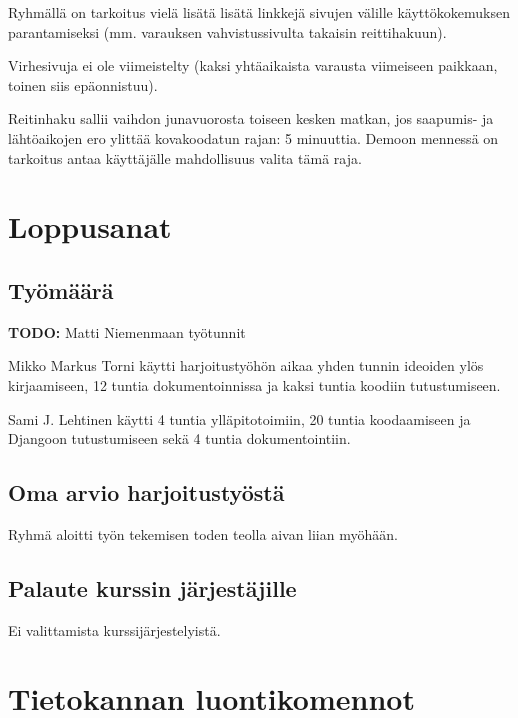 \documentclass[a4paper,twoside,titlepage,12pt]{article}
\begin{document}
Ryhmällä on tarkoitus vielä lisätä lisätä linkkejä sivujen välille
käyttökokemuksen parantamiseksi (mm. varauksen vahvistussivulta takaisin
reittihakuun).

Virhesivuja ei ole viimeistelty (kaksi yhtäaikaista varausta viimeiseen
paikkaan, toinen siis epäonnistuu).

Reitinhaku sallii vaihdon junavuorosta toiseen kesken matkan, jos saapumis- ja
lähtöaikojen ero ylittää kovakoodatun rajan: 5 minuuttia. Demoon mennessä on
tarkoitus antaa käyttäjälle mahdollisuus valita tämä raja.

\section{Loppusanat}
\subsection{Työmäärä}
\textbf{TODO:} Matti Niemenmaan työtunnit

Mikko Markus Torni käytti harjoitustyöhön aikaa yhden tunnin ideoiden ylös kirjaamiseen, 12 tuntia dokumentoinnissa ja kaksi tuntia koodiin tutustumiseen.

Sami J. Lehtinen käytti 4 tuntia ylläpitotoimiin, 20 tuntia koodaamiseen
ja Djangoon tutustumiseen sekä 4 tuntia dokumentointiin.

\subsection{Oma arvio harjoitustyöstä}

Ryhmä aloitti työn tekemisen toden teolla aivan liian myöhään.

\subsection{Palaute kurssin järjestäjille}

Ei valittamista kurssijärjestelyistä.

%
%
%
\newpage
\section*{Tietokannan luontikomennot}


\end{document}
